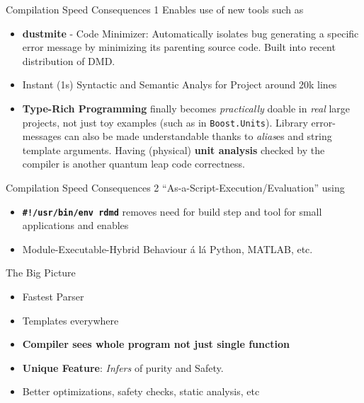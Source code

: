 \documentclass[xcolor=dvipsnames]{beamer}
\begin{document}
\begin{frame}[fragile]{Compilation Speed Consequences 1}
  Enables use of new tools such as
  \begin{itemize}[<+->]
  \item \textbf{dustmite} - Code Minimizer: Automatically isolates bug
    generating a specific error message by minimizing its parenting source
    code. Built into recent distribution of DMD.
  \item Instant (1s) Syntactic and Semantic Analys for Project around 20k lines
  \item \textbf{Type-Rich Programming} finally becomes \emph{practically} doable
    in \emph{real} large projects, not just toy examples (such as in
    \texttt{Boost.Units}). Library error-messages can also be made
    understandable thanks to \emph{alias}es and string template
    arguments. Having (physical) \textbf{unit analysis} checked by the compiler
    is another quantum leap code correctness.
  \end{itemize}
\end{frame}

\begin{frame}[fragile]{Compilation Speed Consequences 2}
  “As-a-Script-Execution/Evaluation” using
  \begin{itemize}[<+->]
  \item \textbf{\texttt{\#!/usr/bin/env rdmd}} removes need for build step
    and tool for small applications and enables
  \item Module-Executable-Hybrid Behaviour á lá Python, MATLAB, etc.
  \end{itemize}
\end{frame}

\begin{frame}[fragile]{The Big Picture}
  \begin{itemize}[<+->]
  \item Fastest Parser
  \item Templates everywhere
  \item \textbf{Compiler sees whole program not just single function}
  \item \textbf{Unique Feature}: \emph{Infers} of purity and Safety.
  \item Better optimizations, safety checks, static analysis, etc
  \end{itemize}
\end{frame}
\end{document}
